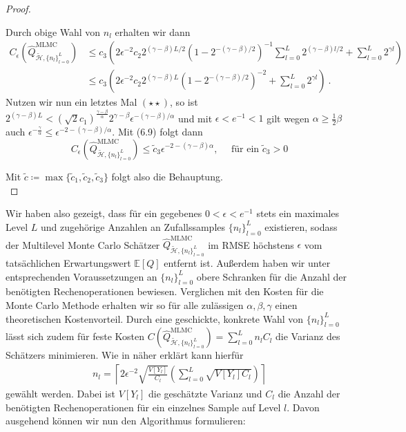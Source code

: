 \begin{proof}
\begin{enumerate}[label=(\roman*)]
\[		\]
		Durch obige Wahl von $ n_l $ erhalten wir dann 
		\begin{align*}
			C_{\epsilon}(\widehat{Q}_{\tilde{\mathcal{H}},\{ n_l \}_{l=0}^L }^{\text{MLMC}}) &\leq c_3 \left( 2\epsilon^{-2} c_2 2^{(\gamma-\beta)L/2}(1-2^{-(\gamma-\beta)/2})^{-1} \sum_{l=0}^L 2^{(\gamma -\beta)l/2} + \sum_{l=0}^L 2^{\gamma l} \right) \\
			&\leq c_3 \left( 2\epsilon^{-2} c_2 2^{(\gamma-\beta)L}(1-2^{-(\gamma-\beta)/2})^{-2}  + \sum_{l=0}^L 2^{\gamma l} \right) \ .
		\end{align*}
		Nutzen wir nun ein letztes Mal $ (\star \star) $, so ist $ 2^{(\gamma-\beta)L} < \left( \sqrt{2}c_1 \right)^{\frac{\gamma-\beta}{\alpha}} 2^{\gamma-\beta} \epsilon^{-(\gamma-\beta)/\alpha} $ und mit $ \epsilon < e^{-1} < 1 $ gilt wegen $ \alpha \geq \frac{1}{2}\beta $ auch $ \epsilon^{-\frac{\gamma}{\alpha}} \leq \epsilon^{-2 -(\gamma - \beta)/\alpha} $.
		Mit (6.9) folgt dann 
		\[
		C_{\epsilon}(\widehat{Q}_{\tilde{\mathcal{H}},\{ n_l \}_{l=0}^L }^{\text{MLMC}}) \leq \tilde{c}_3 \epsilon^{-2-(\gamma-\beta)\alpha} , \quad \text{  für ein } \tilde{c}_3>0
		\]
	\end{enumerate}
	Mit $ \tilde{c} \coloneqq \max\{\tilde{c}_1,\tilde{c}_2,\tilde{c}_3\} $ folgt also die Behauptung.\\
\end{proof}
Wir haben also gezeigt, dass für ein gegebenes $ 0 < \epsilon < e^{-1} $ stets ein maximales Level $ L $ und zugehörige Anzahlen an Zufallssamples $ \{n_l\}_{l=0}^L $
existieren, sodass der Multilevel Monte Carlo Schätzer $ \widehat{Q}_{\tilde{\mathcal{H}},\{ n_l \}_{l=0}^L }^{\text{MLMC}} $ im RMSE höchstens $ \epsilon $ vom tatsächlichen Erwartungswert $ \mathbb{E}[Q] $ entfernt ist. Außerdem haben wir unter entsprechenden Voraussetzungen an $ \{n_l\}_{l=0}^L $ obere Schranken für die Anzahl der benötigten Rechenoperationen bewiesen.
Verglichen mit den Kosten für die Monte Carlo Methode erhalten wir so für alle zulässigen $ \alpha,\beta,\gamma $ einen theoretischen Kostenvorteil. 
Durch eine geschickte, konkrete Wahl von $ \{n_l\}_{l=0}^L $ lässt sich zudem für feste Kosten $ C(\widehat{Q}_{\tilde{\mathcal{H}},\{ n_l \}_{l=0}^L }^{\text{MLMC}} ) = \sum_{l=0}^{L} n_l C_l$ die Varianz des Schätzers minimieren.
Wie in \cite{giles_2015} näher erklärt kann hierfür 
\begin{align}
	\label{OptimalN}
	n_l = \left\lceil 2 \epsilon^{-2} \sqrt{\frac{V[Y_l]}{C_l}} \left( \sum_{l=0}^{L}\sqrt{V[Y_l]C_l} \right) \right\rceil
\end{align}
gewählt werden. Dabei ist $ V[Y_l] $ die geschätzte Varianz und $ C_l $ die Anzahl der benötigten Rechenoperationen für ein einzelnes Sample auf Level $ l $.
Davon ausgehend können wir nun den Algorithmus formulieren:

